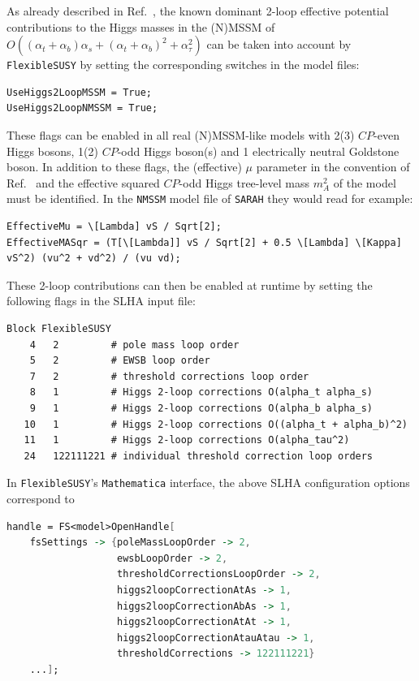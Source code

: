 \documentclass[final,3p,11pt,pdflatex]{elsarticle}
\makeatletter
\newcommand{\modelname}[1]{\texttt{#1}\@\xspace}
\newcommand{\sarah}{\texttt{SARAH}\@\xspace}
\newcommand{\fs}{\texttt{FlexibleSUSY}\@\xspace}
\newcommand{\mathematica}{\texttt{Ma\-the\-ma\-ti\-ca}\xspace}
\newcommand{\CP}{\ensuremath{CP}\xspace}
\def\at{\alpha_t}
\def\ab{\alpha_b}
\def\as{\alpha_s}
\def\atau{\alpha_{\tau}}
\makeatother
\begin{document}
As already described in Ref.~\cite{Athron:2014yba}, the known dominant 2-loop
effective potential contributions to the Higgs masses in the (N)MSSM
of $O((\at + \ab)\as + (\at +
\ab)^2 + \atau^2)$
\cite{Degrassi:2001yf,Brignole:2001jy,Dedes:2002dy,Brignole:2002bz,Dedes:2003km,Degrassi:2009yq}
can be taken into account by \fs by setting the corresponding switches
in the model files:
%
\begin{lstlisting}
UseHiggs2LoopMSSM = True;
UseHiggs2LoopNMSSM = True;
\end{lstlisting}
%
These flags can be enabled in all real (N)MSSM-like models with 2(3)
\CP-even Higgs bosons, 1(2) \CP-odd Higgs boson(s) and 1 electrically neutral
Goldstone boson.  In addition to these flags, the (effective) $\mu$
parameter in the convention of Ref.~\cite{Haber:1984rc} and the effective
squared \CP-odd Higgs tree-level mass $m_A^2$ of the model must be identified.
In the \modelname{NMSSM} model file of \sarah they would read for
example:
%
\begin{lstlisting}
EffectiveMu = \[Lambda] vS / Sqrt[2];
EffectiveMASqr = (T[\[Lambda]] vS / Sqrt[2] + 0.5 \[Lambda] \[Kappa] vS^2) (vu^2 + vd^2) / (vu vd);
\end{lstlisting}
%
These 2-loop contributions can then be enabled at runtime by setting
the following flags in the SLHA input file:
%
\begin{lstlisting}
Block FlexibleSUSY
    4   2         # pole mass loop order
    5   2         # EWSB loop order
    7   2         # threshold corrections loop order
    8   1         # Higgs 2-loop corrections O(alpha_t alpha_s)
    9   1         # Higgs 2-loop corrections O(alpha_b alpha_s)
   10   1         # Higgs 2-loop corrections O((alpha_t + alpha_b)^2)
   11   1         # Higgs 2-loop corrections O(alpha_tau^2)
   24   122111221 # individual threshold correction loop orders
\end{lstlisting}
%
In \fs's \mathematica interface, the above SLHA configuration options
correspond to
%
\begin{lstlisting}[language=Mathematica]
handle = FS<model>OpenHandle[
    fsSettings -> {poleMassLoopOrder -> 2,
                   ewsbLoopOrder -> 2,
                   thresholdCorrectionsLoopOrder -> 2,
                   higgs2loopCorrectionAtAs -> 1,
                   higgs2loopCorrectionAbAs -> 1,
                   higgs2loopCorrectionAtAt -> 1,
                   higgs2loopCorrectionAtauAtau -> 1,
                   thresholdCorrections -> 122111221}
    ...];
\end{lstlisting}
\end{document}
